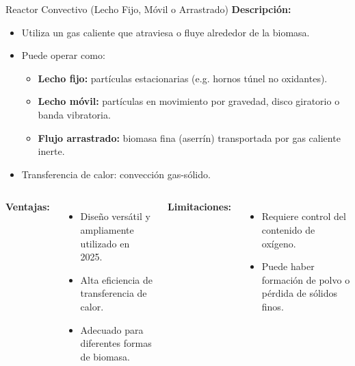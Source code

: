 \documentclass[main.tex]{subfiles}
\begin{document}
\begin{frame}{Reactor Convectivo (Lecho Fijo, Móvil o Arrastrado)}
\footnotesize
\textbf{Descripción:}
\begin{itemize}
  \item Utiliza un gas caliente que atraviesa o fluye alrededor de la biomasa.
  \item Puede operar como:
    \begin{itemize}
      \item \textbf{Lecho fijo:} partículas estacionarias (e.g. hornos túnel no oxidantes).
      \item \textbf{Lecho móvil:} partículas en movimiento por gravedad, disco giratorio o banda vibratoria.
      \item \textbf{Flujo arrastrado:} biomasa fina (aserrín) transportada por gas caliente inerte.
    \end{itemize}
  \item Transferencia de calor: convección gas-sólido.
\end{itemize}

\begin{columns}
  \textbf{Ventajas:}
  \begin{itemize}
    \item Diseño versátil y ampliamente utilizado en 2025.
    \item Alta eficiencia de transferencia de calor.
    \item Adecuado para diferentes formas de biomasa.
  \end{itemize}

  \textbf{Limitaciones:}
  \begin{itemize}
    \item Requiere control del contenido de oxígeno.
    \item Puede haber formación de polvo o pérdida de sólidos finos.
  \end{itemize}
\end{columns}
\end{frame}
\end{document}
